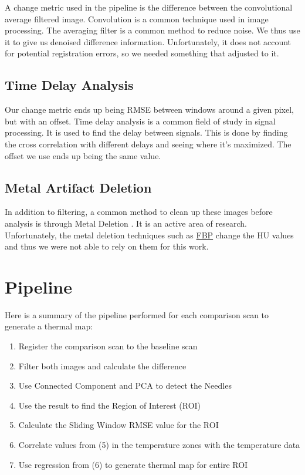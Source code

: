 \documentclass[]{spie}  %
\begin{document}
A change metric used in the pipeline is the difference between the convolutional average filtered image. Convolution is a common technique used in image processing. The averaging filter is a common method to reduce noise. We thus use it to give us denoised difference information. Unfortunately, it does not account for potential registration errors, so we needed something that adjusted to it. 

\subsection{Time Delay Analysis}

Our change metric ends up being RMSE between windows around a given pixel, but with an offset. Time delay analysis is a common field of study in signal processing. It is used to find the delay between signals. This is done by finding the cross correlation with different delays and seeing where it's maximized. The offset we use ends up being the same value. 

\subsection{Metal Artifact Deletion}

In addition to filtering, a common method to clean up these images before analysis is through Metal Deletion \cite{Boas11}. It is an active area of research. Unfortunately, the metal deletion techniques such as \href{http://www.mathworks.com/matlabcentral/fileexchange/34608-ct-reconstruction-package}{FBP} \cite{Bangert12} change the HU values and thus we were not able to rely on them for this work. 


\section{Pipeline}

Here is a summary of the pipeline performed for each comparison scan to generate a thermal map:
\begin{enumerate}
\item Register the comparison scan to the baseline scan
\item Filter both images and calculate the difference
\item Use Connected Component and PCA to detect the Needles
\item Use the result to find the Region of Interest (ROI)
\item Calculate the Sliding Window RMSE value for the ROI
\item Correlate values from (5) in the temperature zones with the temperature data
\item Use regression from (6) to generate thermal map for entire ROI
\end{enumerate}
\end{document}

